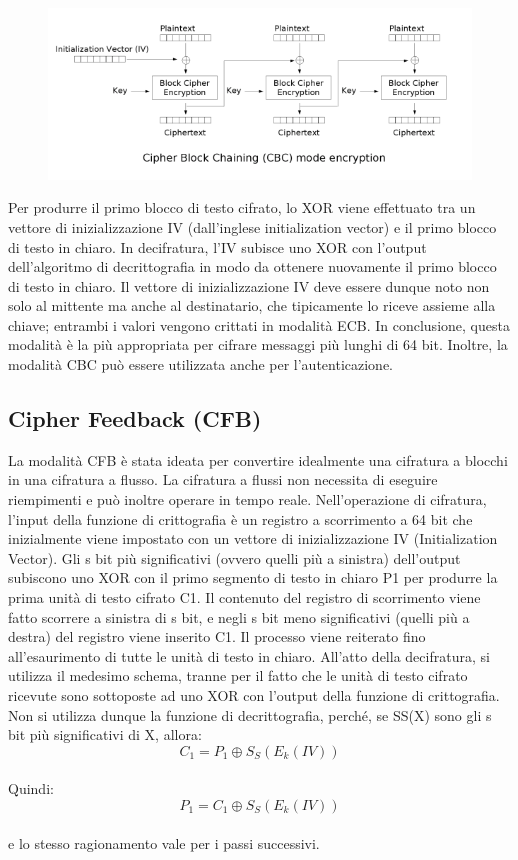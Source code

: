 \documentclass[10pt,a4paper]{article}
\begin{document}
\begin{figure}[htbp]
\includegraphics[scale=0.8]{immagini/cbc.png}
\end{figure}

Per produrre il primo blocco di testo cifrato, lo XOR viene effettuato tra un vettore di inizializzazione IV (dall'inglese initialization vector) e il primo blocco di testo in chiaro. In decifratura, l'IV subisce uno XOR con l'output dell'algoritmo di decrittografia in modo da ottenere nuovamente il primo blocco di testo in chiaro.
Il vettore di inizializzazione IV deve essere dunque noto non solo al mittente ma anche al destinatario, che tipicamente lo riceve assieme alla chiave; entrambi i valori vengono crittati in modalità ECB.
In conclusione, questa modalità è la più appropriata per cifrare messaggi più lunghi di 64 bit. Inoltre, la modalità CBC può essere utilizzata anche per l'autenticazione.

\subsection{Cipher Feedback (CFB)}
La modalità CFB è stata ideata per convertire idealmente una cifratura a blocchi in una cifratura a flusso. La cifratura a flussi non necessita di eseguire riempimenti e può inoltre operare in tempo reale.
Nell'operazione di cifratura, l'input della funzione di crittografia è un registro a scorrimento a 64 bit che inizialmente viene impostato con un vettore di inizializzazione IV (Initialization Vector). Gli s bit più significativi (ovvero quelli più a sinistra) dell'output subiscono uno XOR con il primo segmento di testo in chiaro P1 per produrre la prima unità di testo cifrato C1. Il contenuto del registro di scorrimento viene fatto scorrere a sinistra di s bit, e negli s bit meno significativi (quelli più a destra) del registro viene inserito C1. Il processo viene reiterato fino all'esaurimento di tutte le unità di testo in chiaro.
All'atto della decifratura, si utilizza il medesimo schema, tranne per il fatto che le unità di testo cifrato ricevute sono sottoposte ad uno XOR con l'output della funzione di crittografia. Non si utilizza dunque la funzione di decrittografia, perché, se SS(X) sono gli s bit più significativi di X, allora:
$$ C_1 = P_1 \oplus S_S(E_k(IV)) $$\\
Quindi:\\
$$ P_1 = C_1 \oplus S_S(E_k(IV)) $$\\
e lo stesso ragionamento vale per i passi successivi.
\end{document}
